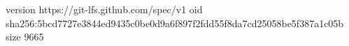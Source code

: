 version https://git-lfs.github.com/spec/v1
oid sha256:5bcd7727e3844ed9435c0be0d9a6f897f2fdd55f8da7cd25058be5f387a1c05b
size 9665
